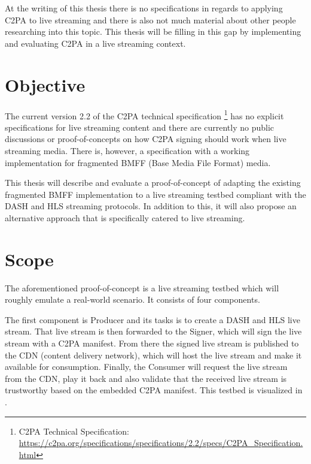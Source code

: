 At the writing of this thesis there is no specifications in regards to applying C2PA to live streaming and there is also not much material about other people researching into this topic. This thesis will be filling in this gap by implementing and evaluating C2PA in a live streaming context.

\section{Objective\label{sec:objective}}

The current version 2.2 of the C2PA technical specification \footnote{C2PA Technical Specification: \url{https://c2pa.org/specifications/specifications/2.2/specs/C2PA_Specification.html}} has no explicit specifications for live streaming content and there are currently no public discussions or proof-of-concepts on how C2PA signing should work when live streaming media. There is, however, a specification with a working implementation for fragmented BMFF (Base Media File Format) media.

This thesis will describe and evaluate a proof-of-concept of adapting the existing fragmented BMFF implementation to a live streaming testbed compliant with the DASH and HLS streaming protocols. In addition to this, it will also propose an alternative approach that is specifically catered to live streaming.

\section{Scope\label{sec:scope}}

The aforementioned proof-of-concept is a live streaming testbed which will roughly emulate a real-world scenario. It consists of four components.

The first component is Producer and its tasks is to create a DASH and HLS live stream. That live stream is then forwarded to the Signer, which will sign the live stream with a C2PA manifest. From there the signed live stream is published to the CDN (content delivery network), which will host the live stream and make it available for consumption. Finally, the Consumer will request the live stream from the CDN, play it back and also validate that the received live stream is trustworthy based on the embedded C2PA manifest. This testbed is visualized in .


